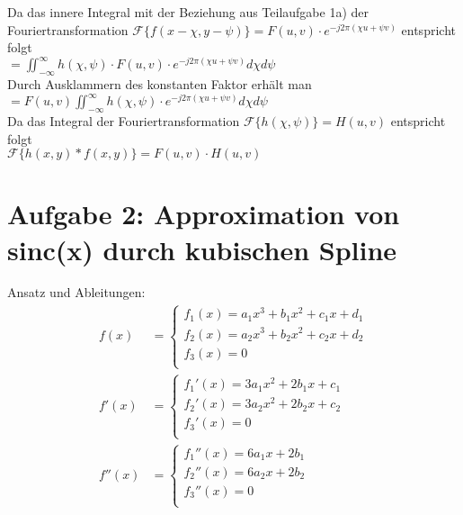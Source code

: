 \documentclass[a4paper,11pt,oneside]{scrartcl}
\begin{document}
Da das innere Integral mit der Beziehung aus Teilaufgabe 1a) der Fouriertransformation $\mathcal{F}\{f(x-\chi,y-\psi)\}=F(u,v)\cdot e^{-j2\pi(\chi u+\psi v)}$ entspricht folgt \\

$=\iint_{-\infty}^{\infty}h(\chi,\psi)\cdot F(u,v)\cdot e^{-j2\pi(\chi u+\psi v)} d\chi d\psi$ \\

Durch Ausklammern des konstanten Faktor erhält man \\

$=F(u,v)\iint_{-\infty}^{\infty}h(\chi,\psi)\cdot e^{-j2\pi(\chi u+\psi v)} d\chi d\psi$ \\

Da das Integral der Fouriertransformation $\mathcal{F}\{h(\chi,\psi)\}=H(u,v)$ entspricht folgt \\

$\mathcal{F}\{h(x,y)\ast f(x,y)\}=F(u,v)\cdot H(u,v)$

\newpage

\section*{Aufgabe 2: Approximation von sinc(x) durch kubischen Spline}

Ansatz und Ableitungen:\\
\begin{equation*}
\begin{array}{ll}
f(x) & = 
 \left\{ 
  \begin{array}{l}
   f_1(x) = a_1x^3 + b_1x^2 + c_1x + d_1\\
   f_2(x) = a_2x^3 + b_2x^2 + c_2x + d_2\\
   f_3(x) = 0\\
  \end{array} 
 \right.
\\[0.5cm]
f'(x) & = 
 \left\{ 
  \begin{array}{l}
   f_1'(x) = 3a_1x^2 + 2b_1x + c_1 \\
   f_2'(x) = 3a_2x^2 + 2b_2x + c_2 \\
   f_3'(x) = 0\\
  \end{array} 
 \right.
\\[0.5cm]
f''(x) & = 
 \left\{
  \begin{array}{l}
   f_1''(x) = 6a_1x + 2b_1\\
   f_2''(x) = 6a_2x + 2b_2\\
   f_3''(x) = 0\\
  \end{array}
 \right.
 \end{array}
\end{equation*}\\
\end{document}
